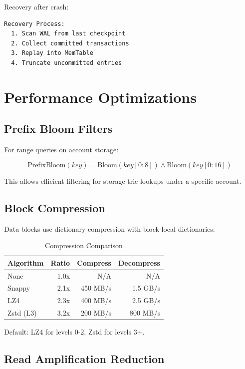 \documentclass[11pt,a4paper]{article}
\begin{document}
Recovery after crash:

\begin{lstlisting}
Recovery Process:
  1. Scan WAL from last checkpoint
  2. Collect committed transactions
  3. Replay into MemTable
  4. Truncate uncommitted entries
\end{lstlisting}

\section{Performance Optimizations}

\subsection{Prefix Bloom Filters}

For range queries on account storage:

\[
\text{PrefixBloom}(key) = \text{Bloom}(key[0:8]) \land \text{Bloom}(key[0:16])
\]

This allows efficient filtering for storage trie lookups under a specific account.

\subsection{Block Compression}

Data blocks use dictionary compression with block-local dictionaries:

\begin{table}[htbp]
\centering
\caption{Compression Comparison}
\begin{tabular}{lrrr}
\toprule
\textbf{Algorithm} & \textbf{Ratio} & \textbf{Compress} & \textbf{Decompress} \\
\midrule
None & 1.0x & N/A & N/A \\
Snappy & 2.1x & 450 MB/s & 1.5 GB/s \\
LZ4 & 2.3x & 400 MB/s & 2.5 GB/s \\
Zstd (L3) & 3.2x & 200 MB/s & 800 MB/s \\
\bottomrule
\end{tabular}
\label{tab:compress}
\end{table}

Default: LZ4 for levels 0-2, Zstd for levels 3+.

\subsection{Read Amplification Reduction}
\end{document}
